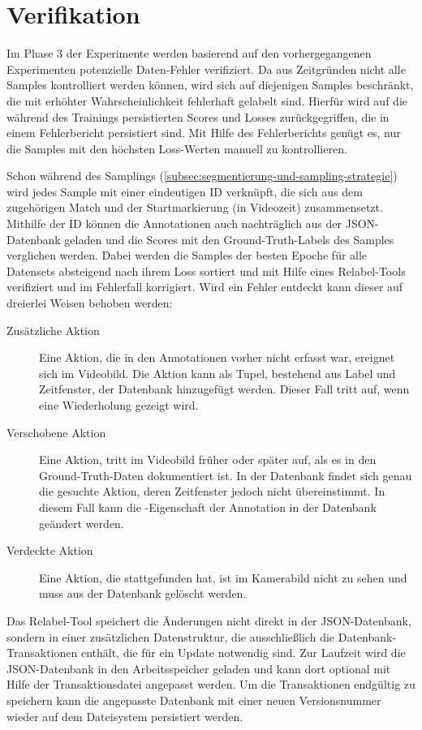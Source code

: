 \section{Verifikation}
\label{sec:nachgang}

Im Phase 3 der Experimente werden basierend auf den vorhergegangenen Experimenten potenzielle Daten-Fehler verifiziert.
Da aus Zeitgründen nicht alle Samples kontrolliert werden können, wird sich auf diejenigen Samples beschränkt, die mit erhöhter Wahrscheinlichkeit fehlerhaft gelabelt sind.
Hierfür wird auf die während des Trainings persistierten Scores und Losses zurückgegriffen, die in einem Fehlerbericht persistiert sind.
Mit Hilfe des Fehlerberichts genügt es, nur die Samples mit den höchsten Loss-Werten manuell zu kontrollieren.

Schon während des Samplings (\autoref{subsec:segmentierung-und-sampling-strategie}) wird jedes Sample mit einer eindeutigen ID verknüpft, die sich aus dem zugehörigen Match und der Startmarkierung (in Videozeit) zusammensetzt.
Mithilfe der ID können die Annotationen auch nachträglich aus der JSON-Datenbank geladen und die Scores mit den Ground-Truth-Labels des Samples verglichen werden.
Dabei werden die Samples der besten Epoche für alle Datensets absteigend nach ihrem Loss sortiert und mit Hilfe eines Relabel-Tools verifiziert und im Fehlerfall \ggf korrigiert.
Wird ein Fehler entdeckt kann dieser auf dreierlei Weisen behoben werden:

\begin{description}
    \item[Zusätzliche Aktion] Eine Aktion, die in den Annotationen vorher nicht erfasst war, ereignet sich im Videobild.
    Die Aktion kann als Tupel, bestehend aus Label und Zeitfenster, der Datenbank hinzugefügt werden.
    Dieser Fall tritt \zB auf, wenn eine Wiederholung gezeigt wird.
    \item[Verschobene Aktion] Eine Aktion, tritt im Videobild früher oder später auf, als es in den Ground-Truth-Daten dokumentiert ist.
    In der Datenbank findet sich genau die gesuchte Aktion, deren Zeitfenster jedoch nicht übereinstimmt.
    In diesem Fall kann die -Eigenschaft der Annotation in der Datenbank geändert werden.
    \item[Verdeckte Aktion] Eine Aktion, die stattgefunden hat, ist im Kamerabild nicht zu sehen und muss aus der Datenbank gelöscht werden.
\end{description}

Das Relabel-Tool speichert die Änderungen nicht direkt in der JSON-Datenbank, sondern in einer zusätzlichen Datenstruktur, die ausschließlich die Datenbank-Transaktionen enthält, die für ein Update notwendig sind.
Zur Laufzeit wird die JSON-Datenbank in den Arbeitsspeicher geladen und kann dort optional mit Hilfe der Transaktionsdatei angepasst werden.
Um die Transaktionen endgültig zu speichern kann die angepasste Datenbank mit einer neuen Versionsnummer wieder auf dem Dateisystem persistiert werden.

